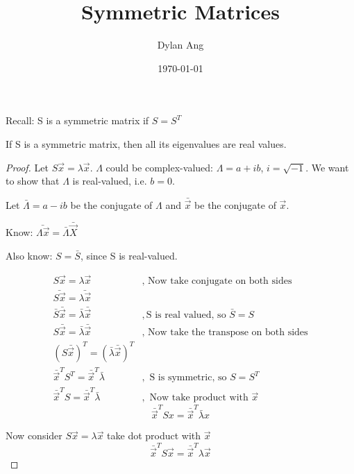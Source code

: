 \documentclass[12pt]{amsart}
\title{Symmetric Matrices}
\author{Dylan Ang}
\date{\today}
\numberwithin{equation}{theorem}    %
\begin{document}
\maketitle

Recall: S is a symmetric matrix if $S=S^T$

\begin{theorem}
    If S is a symmetric matrix, then all its eigenvalues are real values.
\end{theorem}

\begin{proof}
    Let $S\vec{x} = \lambda \vec{x}$. $\Lambda$ could be complex-valued: $\Lambda=a+ib$, $i=\sqrt{-1}$. We want to show that $\Lambda$ is real-valued, i.e. $b=0$.

    Let $\bar\Lambda=a-ib$ be the conjugate of $\Lambda$ and $\bar{\vec{x}}$ be the conjugate of $\vec{x}$.

    Know: $\bar{\Lambda \vec{x}} = \bar\Lambda \bar\vec{X}$

    Also know: $S=\bar S$, since S is real-valued.

    \begin{align*}
        S\vec{x} = \lambda \vec{x}                            & \text{, Now take conjugate on both sides}      \\
        \bar{S\vec{x}} = \bar{\lambda \vec{x}}                &                                                \\
        \bar S \bar \vec{x} = \bar\lambda \bar\vec{x}         & , \text{S is real valued, so } \bar S = S      \\
        S \bar \vec{x} = \bar\lambda \bar\vec{x}              & , \text{ Now take the transpose on both sides} \\
        (S\bar \vec{x})^{T} = (\bar \lambda \bar \vec{x})^{T} &                                                \\
        \bar\vec{x}^T S^{T} = \bar\vec{x}^{T} \bar \lambda    & , \text{ S is symmetric, so } S=S^{T}          \\
        \bar\vec{x}^T S = \bar\vec{x}^T \bar\lambda           & , \text{ Now take product with } \vec{x}       
    \end{align*}
    \begin{equation}\label{normal x}
        \bar\vec{x}^T Sx = \bar\vec{x}^T \bar\lambda x 
    \end{equation}

    Now consider $S\vec{x}=\lambda\vec{x}$ take dot product with $\vec{x}$
    \begin{equation}\label{vec x}
        \bar\vec{x}^T S \vec{x} = \bar\vec{x}^T \lambda \vec{x} 
    \end{equation}


\end{proof}
\end{document}
